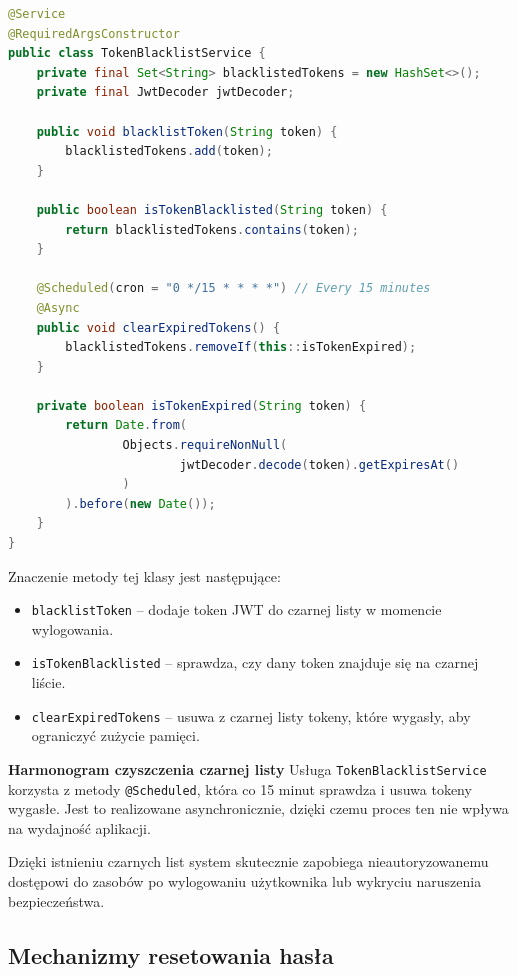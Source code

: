 \begin{lstlisting}[language=Java, style=JavaStyle, caption=Klasa \texttt{TokenBlacklistService}]
@Service
@RequiredArgsConstructor
public class TokenBlacklistService {
    private final Set<String> blacklistedTokens = new HashSet<>();
    private final JwtDecoder jwtDecoder;

    public void blacklistToken(String token) {
        blacklistedTokens.add(token);
    }

    public boolean isTokenBlacklisted(String token) {
        return blacklistedTokens.contains(token);
    }

    @Scheduled(cron = "0 */15 * * * *") // Every 15 minutes
    @Async
    public void clearExpiredTokens() {
        blacklistedTokens.removeIf(this::isTokenExpired);
    }

    private boolean isTokenExpired(String token) {
        return Date.from(
                Objects.requireNonNull(
                        jwtDecoder.decode(token).getExpiresAt()
                )
        ).before(new Date());
    }
}
\end{lstlisting}

\noindent Znaczenie metody tej klasy jest następujące:
\begin{itemize}
    \item \texttt{blacklistToken} -- dodaje token JWT do czarnej listy w momencie wylogowania.
    \item \texttt{isTokenBlacklisted} -- sprawdza, czy dany token znajduje się na czarnej liście.
    \item \texttt{clearExpiredTokens} -- usuwa z czarnej listy tokeny, które wygasły, aby ograniczyć zużycie pamięci.
\end{itemize}

\noindent \textbf{Harmonogram czyszczenia czarnej listy}\newline
Usługa \texttt{TokenBlacklistService} korzysta z metody \texttt{@Scheduled}, która co 15 minut sprawdza i usuwa tokeny wygasłe. Jest to realizowane asynchronicznie, dzięki czemu proces ten nie wpływa na wydajność aplikacji.

Dzięki istnieniu czarnych list system skutecznie zapobiega nieautoryzowanemu dostępowi do zasobów po wylogowaniu użytkownika lub wykryciu naruszenia bezpieczeństwa.

\subsection{Mechanizmy resetowania hasła}

